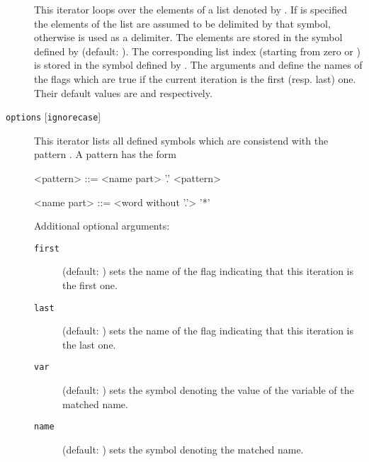 \documentclass[11pt,a4paper]{refrep}
\begin{document}
\begin{description}
   This iterator loops over the elements of a list denoted by .
   If  is specified the elements of the list are assumed to
   be delimited by that symbol, otherwise \lit{,} is used as a delimiter.
   The elements are stored in the symbol defined by 
   (default: \lit{\$\_}). The corresponding list index (starting from zero
   or ) is stored in the symbol defined by .
   The arguments  and  define the names of the flags
   which are true if the current iteration is the first (resp. last) one.
   Their default values are  and  respectively.
\item[\texttt{options} \synt{pattern} {[\texttt{ignorecase}]}]
   This iterator lists all defined symbols
   which are consistend with the pattern . A pattern has the
   form
\begin{grammar}
<pattern> ::= <name part>
    '.' <pattern>

<name part> ::= <word without '.'> \alt '*'
\end{grammar}
   Additional optional arguments:
   \begin{description}
   \item[\texttt{first}] (default: ) sets the name of the
      flag indicating that this iteration is the first one.
   \item[\texttt{last}] (default: ) sets the name of the
      flag indicating that this iteration is the last one.
   \item[\texttt{var}] (default: \lit{\$\_}) sets the symbol
      denoting the value of the variable of the matched name.
   \item[\texttt{name}] (default: ) sets the symbol
      denoting the matched name.
   \end{description}


\end{description}
\end{document}

